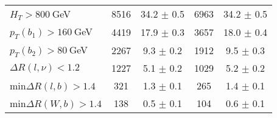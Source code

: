 \begin{tabular}{lcccc}
$H_T>800~$GeV           & 8516  & 34.2 	        $\pm$ 	0.5 	 & 6963  & 34.2 	$\pm$ 	0.5 	\\
$p_T(b_1) > 160~$GeV    & 4419  & 17.9 	        $\pm$ 	0.3 	 & 3657  & 18.0 	$\pm$ 	0.4 	\\
$p_T(b_2) >80~$GeV      & 2267  & 9.3        	$\pm$ 	0.2 	 & 1912  & 9.5 	        $\pm$ 	0.3 	\\
$\Delta R(l,\nu)<1.2$   & 1227  & 5.1 	        $\pm$ 	0.2 	 & 1029  & 5.2 	        $\pm$ 	0.2 	\\
min$\Delta R(l,b)>1.4$  & 321  & 1.3 	        $\pm$ 	0.1 	 & 265  & 1.4 	        $\pm$ 	0.1 	\\
min$\Delta R(W,b)>1.4$  & 138  & 0.5 	        $\pm$ 	0.1 	 & 104  & 0.6 	        $\pm$ 	0.1 	\\
\bottomrule
\end{tabular}
